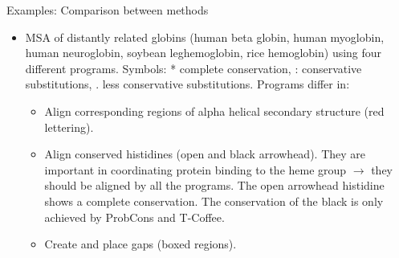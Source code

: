 \begin{frame}{Examples: Comparison between methods}

    \begin{itemize}
        \item MSA of distantly related globins (human beta globin, human myoglobin, human neuroglobin, soybean leghemoglobin, rice hemoglobin) using four different programs. Symbols: * complete conservation, : conservative substitutions, . less conservative substitutions. Programs differ in:
        \begin{itemize}
            \item Align corresponding regions of alpha helical secondary structure (red lettering).
            \item Align conserved histidines (open and black arrowhead). They are important in coordinating protein binding to the heme group $\rightarrow$ they should be aligned by all the programs. The open arrowhead histidine shows a complete conservation. The conservation of the black is only achieved by ProbCons and T-Coffee.
            \item Create and place gaps (boxed regions).
        \end{itemize}
    \end{itemize}
            
\end{frame}

